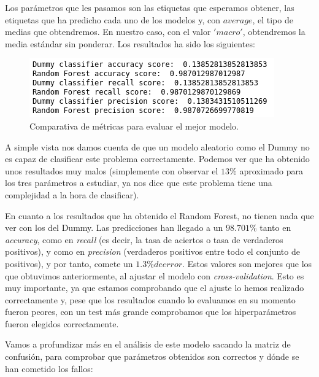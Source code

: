 \documentclass[11pt,a4paper]{article}
\begin{document}
Los parámetros que les pasamos son las etiquetas que esperamos obtener, las etiquetas que ha predicho cada uno de los modelos y, con $average$, el tipo de medias que obtendremos. En nuestro caso, con el valor $'macro'$, obtendremos la media estándar sin ponderar. Los resultados ha sido los siguientes:

\begin{figure}[H]
    \centering
    \includegraphics{img/model-comp-scores.png}
    \caption{Comparativa de métricas para evaluar el mejor modelo.}
    \label{fig:model-comp-scores}
\end{figure}

A simple vista nos damos cuenta de que un modelo aleatorio como el Dummy no es capaz de clasificar este problema correctamente. Podemos ver que ha obtenido unos resultados muy malos (simplemente con observar el $13\%$ aproximado para los tres parámetros a estudiar, ya nos dice que este problema tiene una complejidad a la hora de clasificar).

En cuanto a los resultados que ha obtenido el Random Forest, no tienen nada que ver con los del Dummy. Las predicciones han llegado a un $98.701\%$ tanto en \textit{accuracy}, como en \textit{recall} (es decir, la tasa de aciertos o tasa de verdaderos positivos), y como en \textit{precision} (verdaderos positivos entre todo el conjunto de positivos), y por tanto, comete un $1.3\% de error$. Estos valores son mejores que los que obtuvimos anteriormente, al ajustar el modelo con \textit{cross-validation}. Esto es muy importante, ya que estamos comprobando que el ajuste lo hemos realizado correctamente y, pese que los resultados cuando lo evaluamos en su momento fueron peores, con un test más grande comprobamos que los hiperparámetros fueron elegidos correctamente.

Vamos a profundizar más en el análisis de este modelo sacando la matriz de confusión, para comprobar que parámetros obtenidos son correctos y dónde se han cometido los fallos:
\end{document}
